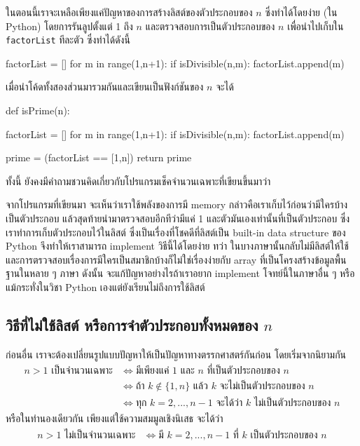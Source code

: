 ในตอนนี้เราจะเหลือเพียงแค่ปัญหาของการสร้างลิสต์ของตัวประกอบของ $n$ ซึ่งทำได้โดยง่าย (ใน Python) โดยการรันลูปตั้งแต่ 1 ถึง $n$ และตรวจสอบการเป็นตัวประกอบของ $n$ เพื่อนำไปเก็บใน \texttt{factorList} ทีละตัว ซึ่งทำได้ดังนี้

\begin{python*}
factorList = []
for m in range(1,n+1):
    if isDivisible(n,m):
        factorList.append(m)
\end{python*}

เมื่อนำโค้ดทั้งสองส่วนมารวมกันและเขียนเป็นฟังก์ชันของ $n$ จะได้
\begin{python}
def isPrime(n):

    factorList = []
    for m in range(1,n+1):
        if isDivisible(n,m):
            factorList.append(m)

    prime = (factorList == [1,n])
    return prime
\end{python}

ทั้งนี้ ยังคงมีคำถามชวนคิดเกี่ยวกับโปรแกรมเช็คจำนวนเฉพาะที่เขียนขึ้นมาว่า

จากโปรแกรมที่เขียนมา จะเห็นว่าเราใช้พลังของการมี memory กล่าวคือเราเก็บไว้ก่อนว่ามีใครบ้างเป็นตัวประกอบ แล้วสุดท้ายนำมาตรวจสอบอีกทีว่ามีแค่ 1 และตัวมันเองเท่านั้นที่เป็นตัวประกอบ ซึ่งเราทำการเก็บตัวประกอบไว้ในลิสต์ ซึ่งเป็นเรื่องที่โชคดีที่ลิสต์เป็น built-in data structure ของ Python จึงทำให้เราสามารถ implement วิธีนี้ได้โดยง่าย
ทว่า ในบางภาษานั้นกลับไม่มีลิสต์ให้ใช้ และการตรวจสอบเรื่องการมีใครเป็นสมาชิกบ้างก็ไม่ใช่เรื่องง่ายกับ array ที่เป็นโครงสร้างข้อมูลพื้นฐานในหลาย ๆ ภาษา
ดังนั้น จะแก้ปัญหาอย่างไรถ้าเราอยาก implement โจทย์นี้ในภาษาอื่น ๆ หรือแม้กระทั่งในวิชา Python เองแต่ยังเรียนไม่ถึงการใช้ลิสต์

\subsection{วิธีที่ไม่ใช้ลิสต์ หรือการจำตัวประกอบทั้งหมดของ $n$}
ก่อนอื่น เราจะต้องเปลี่ยนรูปแบบปัญหาให้เป็นปัญหาทางตรรกศาสตร์กันก่อน โดยเริ่มจากนิยามกัน
\begin{align*}
	n>1 \text{ เป็นจำนวนเฉพาะ}
	&\Longleftrightarrow \text{มีเพียงแค่ 1 และ $n$ ที่เป็นตัวประกอบของ $n$}\\
	&\Longleftrightarrow \text{ถ้า $k \notin \{1,n\}$ แล้ว $k$ จะไม่เป็นตัวประกอบของ $n$}\\
	&\Longleftrightarrow \text{ทุก $k=2,...,n-1$ จะได้ว่า $k$ ไม่เป็นตัวประกอบของ $n$}
\end{align*}
หรือในทำนองเดียวกัน เพียงแต่ใช้ความสมมูลเชิงนิเสธ จะได้ว่า
\begin{align*}
	n>1 \text{ ไม่เป็นจำนวนเฉพาะ}
	&\Longleftrightarrow \text{มี $k=2,...,n-1$ ที่ $k$ เป็นตัวประกอบของ $n$}
\end{align*}

